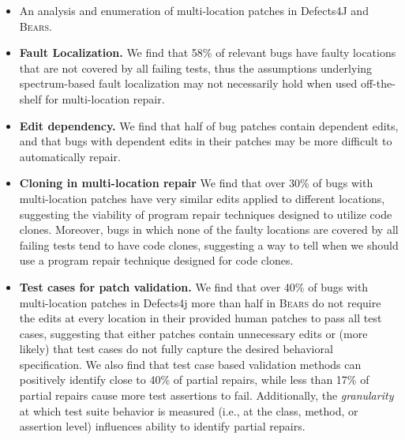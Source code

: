\documentclass[10pt, conference]{IEEEtran}
\newcommand\bears{\textsc{Bears}\xspace}
\begin{document}
\begin{itemize}
\item An analysis and enumeration of multi-location patches in Defects4J and \bears.
\item \textbf{Fault Localization.}  We find that 58\% of relevant bugs have faulty locations that are not
  covered by all failing tests, thus the assumptions underlying spectrum-based
  fault localization may not necessarily hold when used off-the-shelf for
  multi-location repair.
\item \textbf{Edit dependency.} We 
find that half of bug patches contain dependent edits, and that bugs with dependent 
edits in their patches may be more difficult to automatically repair.
\item \textbf{Cloning in multi-location repair} We find that over 30\% of bugs with multi-location
patches have very similar edits applied to different locations, suggesting the viability of 
program repair techniques designed to utilize code clones. Moreover, bugs in which 
none of the faulty locations are covered by all failing tests tend to have code clones, 
suggesting a way to tell when we should use a program repair technique designed for code 
clones.
\item \textbf{Test cases for patch validation.} We find that over 40\% of bugs with multi-location
  patches in Defects4j more than half in \bears do not require the edits at every
  location in their provided human patches to pass all test cases, suggesting
  that either patches contain unnecessary edits or (more likely) that test cases
  do not fully capture the desired behavioral specification.  We also find that test 
  case based validation methods can positively identify close to 40\% of partial repairs,
  while less than
  17\% of partial repairs cause more test assertions to fail. Additionally, the 
  \emph{granularity} at which test suite behavior is measured (i.e., at the class,
  method, or assertion level) influences ability to identify partial
  repairs. 
\end{itemize}

\end{document}
